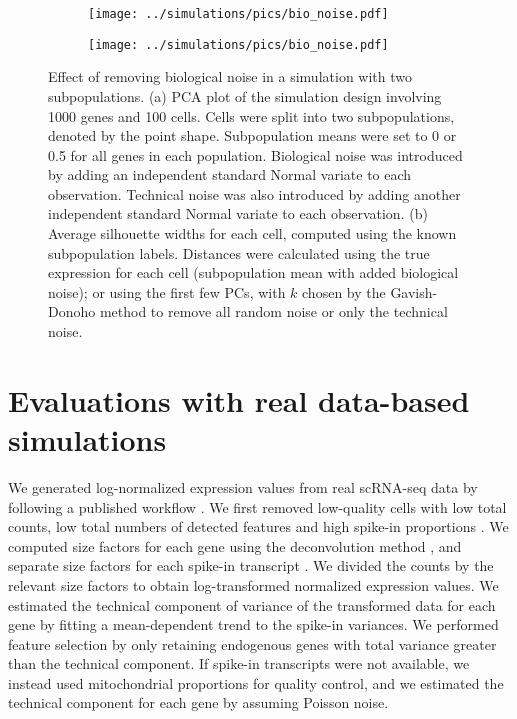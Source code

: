 \documentclass[10pt,letterpaper]{article}
\begin{document}
\begin{figure}[btp]
\centering
\begin{subfigure}[b]{0.49\textwidth}
\texttt{[image: ../simulations/pics/bio\_noise.pdf]}
\caption{}
\end{subfigure}
\begin{subfigure}[b]{0.49\textwidth}
\texttt{[image: ../simulations/pics/bio\_noise.pdf]}
\caption{}
\end{subfigure}
\caption{Effect of removing biological noise in a simulation with two subpopulations.
(a) PCA plot of the simulation design involving 1000 genes and 100 cells.
Cells were split into two subpopulations, denoted by the point shape.
Subpopulation means were set to 0 or 0.5 for all genes in each population.
Biological noise was introduced by adding an independent standard Normal variate to each observation.
Technical noise was also introduced by adding another independent standard Normal variate to each observation.
(b) Average silhouette widths for each cell, computed using the known subpopulation labels.
Distances were calculated using the true expression for each cell (subpopulation mean with added biological noise);
or using the first few PCs, with $k$ chosen by the Gavish-Donoho method to remove all random noise or only the technical noise.
}
\label{fig:bionoise}
\end{figure}

\section{Evaluations with real data-based simulations}

We generated log-normalized expression values from real scRNA-seq data by following a published workflow \cite{lun2016stepbystep}.
We first removed low-quality cells with low total counts, low total numbers of detected features and high spike-in proportions \cite{mccarthy2017scater}.
We computed size factors for each gene using the deconvolution method \cite{lun2016pooling}, and separate size factors for each spike-in transcript \cite{lun2017assessing}.
We divided the counts by the relevant size factors to obtain log-transformed normalized expression values.
We estimated the technical component of variance of the transformed data for each gene by fitting a mean-dependent trend to the spike-in variances.
We performed feature selection by only retaining endogenous genes with total variance greater than the technical component.
If spike-in transcripts were not available, we instead used mitochondrial proportions for quality control,
and we estimated the technical component for each gene by assuming Poisson noise.  
\end{document}
